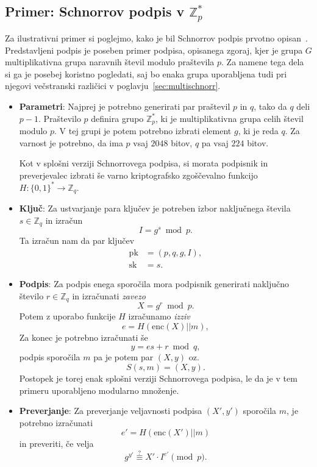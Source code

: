 \documentclass[isrm2, tisk]{fmfdelo}
\newcommand{\Z}{\mathbb Z}
\begin{document}
\subsection{Primer: Schnorrov podpis v \texorpdfstring{$\Z_p^*$}{Zp∗}}
Za ilustrativni primer si poglejmo, kako je bil Schnorrov podpis prvotno opisan~\cite{schnorr1989sig}.
Predstavljeni podpis je poseben primer podpisa, opisanega zgoraj, kjer je grupa $G$ multiplikativna
grupa naravnih števil modulo praštevila $p$. Za namene tega dela si ga je posebej koristno pogledati,
saj bo enaka grupa uporabljena tudi pri njegovi večstranski različici v poglavju~\ref{sec:multischnorr}.
\begin{itemize}
    \item \textbf{Parametri}:
    Najprej je potrebno generirati par praštevil $p$ in $q$, tako da $q$ deli $p - 1$. Praštevilo $p$
    definira grupo $\Z_p^*$, ki je multiplikativna grupa celih števil modulo $p$. V tej grupi je potem
    potrebno izbrati element $g$, ki je reda $q$. Za varnost je potrebno, da ima $p$ vsaj $2048$ bitov,
    $q$ pa vsaj $224$ bitov.

    Kot v splošni verziji Schnorrovega podpisa, si morata podpisnik in preverjevalec izbrati še varno
    kriptografsko zgoščevalno funkcijo $H : \{0, 1\}^* \rightarrow \Z_q$.

    \item \textbf{Ključ}:
    Za ustvarjanje para ključev je potreben izbor naključnega števila $s \in \Z_q$
    in izračun 
    $$ 
    I = g^s \bmod p.
    $$
    Ta izračun nam da par ključev
    \begin{align*}
    \text{pk} &= (p, q, g, I), \\
    \text{sk} &= s.
    \end{align*}

    \item \textbf{Podpis}:
    Za podpis enega sporočila mora podpisnik generirati naključno število $r \in \Z_q$ in izračunati 
    \textit{zavezo} 
    $$ 
    X = g^r \bmod p.
    $$ 
    Potem z uporabo funkcije $H$ izračunamo \textit{izziv} 
    $$
    e = H(\text{enc}(X) || m),
    $$
    Za konec je potrebno izračunati še 
    $$ 
    y = es + r \bmod q, 
    $$
    podpis sporočila $m$ pa je potem par $(X, y)$ oz.\ 
    $$ 
    S(s, m) = (X, y).
    $$
    Postopek je torej enak splošni verziji Schnorrovega podpisa, le da je v tem primeru uporabljeno
    modularno množenje.

    \item \textbf{Preverjanje}:
    Za preverjanje veljavnosti podpisa $(X', y')$ sporočila $m$, je potrebno izračunati 
    $$ 
    e' = H(\text{enc}(X') || m)
    $$
    in preveriti, če velja 
    \begin{equation}
        g^{y'} \stackrel{?}{\equiv} X' \cdot I^{e'} \pmod p. \label{eq:schnorr-ver}
    \end{equation}
\end{itemize}
\end{document}
